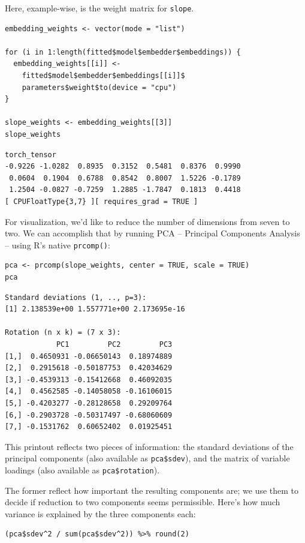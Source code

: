 \documentclass[
  letterpaper,
]{krantz}
\begin{document}
Here, example-wise, is the weight matrix for \texttt{slope}.

\begin{verbatim}
embedding_weights <- vector(mode = "list")

for (i in 1:length(fitted$model$embedder$embeddings)) {
  embedding_weights[[i]] <-
    fitted$model$embedder$embeddings[[i]]$
    parameters$weight$to(device = "cpu")
}

slope_weights <- embedding_weights[[3]]
slope_weights
\end{verbatim}

\begin{verbatim}
torch_tensor
-0.9226 -1.0282  0.8935  0.3152  0.5481  0.8376  0.9990
 0.0604  0.1904  0.6788  0.8542  0.8007  1.5226 -0.1789
 1.2504 -0.0827 -0.7259  1.2885 -1.7847  0.1813  0.4418
[ CPUFloatType{3,7} ][ requires_grad = TRUE ]
\end{verbatim}

For visualization, we'd like to reduce the number of dimensions from
seven to two. We can accomplish that by running PCA -- Principal
Components Analysis -- using R's native \texttt{prcomp()}:

\begin{verbatim}
pca <- prcomp(slope_weights, center = TRUE, scale = TRUE)
pca
\end{verbatim}

\begin{verbatim}
Standard deviations (1, .., p=3):
[1] 2.138539e+00 1.557771e+00 2.173695e-16

Rotation (n x k) = (7 x 3):
            PC1         PC2         PC3
[1,]  0.4650931 -0.06650143  0.18974889
[2,]  0.2915618 -0.50187753  0.42034629
[3,] -0.4539313 -0.15412668  0.46092035
[4,]  0.4562585 -0.14058058 -0.16106015
[5,] -0.4203277 -0.28128658  0.29209764
[6,] -0.2903728 -0.50317497 -0.68060609
[7,] -0.1531762  0.60652402  0.01925451
\end{verbatim}

This printout reflects two pieces of information: the standard
deviations of the principal components (also available as
\texttt{pca\$sdev}), and the matrix of variable loadings (also available
as \texttt{pca\$rotation}).

The former reflect how important the resulting components are; we use
them to decide if reduction to two components seems permissible. Here's
how much variance is explained by the three components each:

\begin{verbatim}
(pca$sdev^2 / sum(pca$sdev^2)) %>% round(2)
\end{verbatim}
\end{document}
